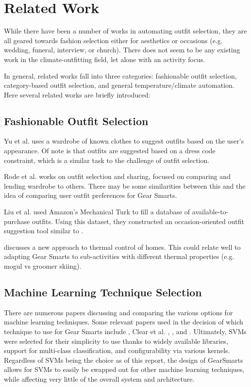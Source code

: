 \section{Related Work}
\label{section:relatedwork}
While there have been a number of works in automating outfit selection, they are all geared towards
fashion selection either for aesthetics or occasions (e.g. wedding, funeral, interview, or church).
There does not seem to be any existing work in the climate-outfitting field, let alone with an
activity focus.

In general, related works fall into three categories: fashionable outfit selection, category-based
outfit selection, and general temperature/climate automation. Here several related works are briefly introduced:

\subsection{Fashionable Outfit Selection}
Yu et al. \cite{Dressup} uses a wardrobe of known clothes to suggest outfits based on the user's appearance.
Of note is that outfits are suggested based on a dress code constraint, which is a similar task to
the challenge of outfit selection.

Rode et al. \cite{SmartCloset} works on outfit selection and sharing, focused on comparing and lending wardrobe
to others. There may be some similarities between this and the idea of comparing user outfit preferences
for Gear Smarts.

Liu et al. \cite{MagicCloset} used Amazon's Mechanical Turk to fill a database of available-to-purchase outfits.
Using this dataset, they constructed an occasion-oriented outfit suggestion tool similar to \cite{Dressup}.

\cite{ThermalComfort} discusses a new approach to thermal control of homes. This could relate well to
adapting Gear Smarts to sub-activities with different thermal properties (e.g. mogul vs groomer skiing).

\subsection{Machine Learning Technique Selection}
There are numerous papers discussing and comparing the various options for machine learning techniques.
Some relevant papers used in the decision of which technique to use for Gear Smarts include \cite{ML:MapReduceClusters},
Clear et al. \cite{ML:ManufacturingSystems}, \cite{ML:IPTraffic}, and \cite{ML:GeoMapping}. Ultimately, SVMs were selected
for their simplicity to use thanks to widely available libraries, support for multi-class classification, and configurability
via various kernels. Regardless of SVMs being the choice as of this report, the design of GearSmarts allows for SVMs
to easily be swapped out for other machine learning techniques, while affecting very little of the overall system and
architecture.